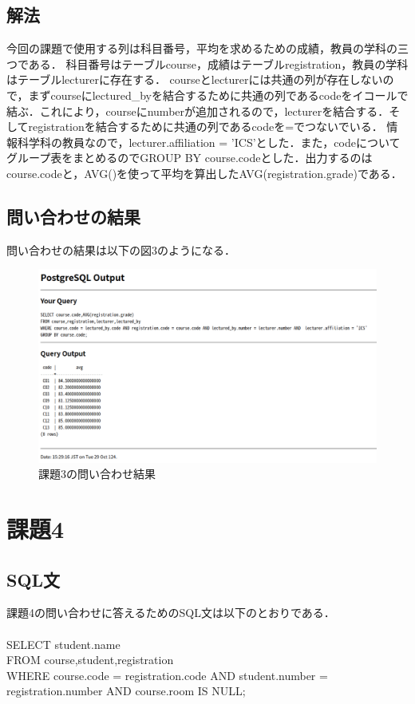 \documentclass[dvipdfmx]{jarticle}
\begin{document}
\subsection{解法}
今回の課題で使用する列は科目番号，平均を求めるための成績，教員の学科の三つである．
科目番号はテーブルcourse，成績はテーブルregistration，教員の学科はテーブルlecturerに存在する．
courseとlecturerには共通の列が存在しないので，まずcourseにlectured\_byを結合するために共通の列であるcodeをイコールで結ぶ．これにより，courseにnumberが追加されるので，lecturerを結合する．そしてregistrationを結合するために共通の列であるcodeを=でつないでいる．
情報科学科の教員なので，lecturer.affiliation = 'ICS'とした．また，codeについてグループ表をまとめるのでGROUP BY course.codeとした．出力するのはcourse.codeと，AVG()を使って平均を算出したAVG(registration.grade)である．
\subsection{問い合わせの結果}
問い合わせの結果は以下の図3のようになる．
\begin{figure}[h]
    \centering
    \includegraphics[width=12cm]{kadai3.png}
    \caption{課題3の問い合わせ結果}
\end{figure}
\section{課題4}
\subsection{SQL文}
課題4の問い合わせに答えるためのSQL文は以下のとおりである．
\\\\
SELECT student.name\\
FROM course,student,registration\\
WHERE course.code = registration.code AND student.number = registration.number AND course.room IS NULL;
\end{document}
